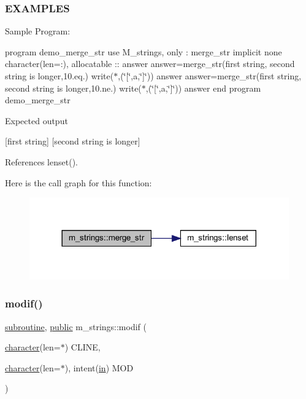 \subsubsection*{E\+X\+A\+M\+P\+L\+ES}

Sample Program\+:

program demo\+\_\+merge\+\_\+str use M\+\_\+strings, only \+: merge\+\_\+str implicit none character(len=\+:), allocatable \+:\+: answer answer=merge\+\_\+str(\textquotesingle{}first string\textquotesingle{}, \textquotesingle{}second string is longer\textquotesingle{},10.\+eq.) write($\ast$,\textquotesingle{}(\char`\"{}\mbox{[}\char`\"{},a,\char`\"{}\mbox{]}\char`\"{})\textquotesingle{}) answer answer=merge\+\_\+str(\textquotesingle{}first string\textquotesingle{}, \textquotesingle{}second string is longer\textquotesingle{},10.\+ne.) write($\ast$,\textquotesingle{}(\char`\"{}\mbox{[}\char`\"{},a,\char`\"{}\mbox{]}\char`\"{})\textquotesingle{}) answer end program demo\+\_\+merge\+\_\+str

Expected output

\mbox{[}first string\mbox{]} \mbox{[}second string is longer\mbox{]} 

References lenset().

Here is the call graph for this function\+:
\nopagebreak
\begin{figure}[H]
\begin{center}
\leavevmode
\includegraphics[width=317pt]{namespacem__strings_aba5a8d7fc092b38d1939f37a13247c1e_cgraph}
\end{center}
\end{figure}
\mbox{\label{namespacem__strings_aec887410b018916a683fbb2ae529f8c5}} 
\subsubsection{\texorpdfstring{modif()}{modif()}}
{\footnotesize\ttfamily \hyperlink{M__stopwatch_83_8txt_acfbcff50169d691ff02d4a123ed70482}{subroutine}, \hyperlink{M__stopwatch_83_8txt_a2f74811300c361e53b430611a7d1769f}{public} m\+\_\+strings\+::modif (\begin{DoxyParamCaption}\item[{\hyperlink{option__stopwatch_83_8txt_abd4b21fbbd175834027b5224bfe97e66}{character}(len=$\ast$)}]{C\+L\+I\+NE,  }\item[{\hyperlink{option__stopwatch_83_8txt_abd4b21fbbd175834027b5224bfe97e66}{character}(len=$\ast$), intent(\hyperlink{M__journal_83_8txt_afce72651d1eed785a2132bee863b2f38}{in})}]{M\+OD }\end{DoxyParamCaption})}



